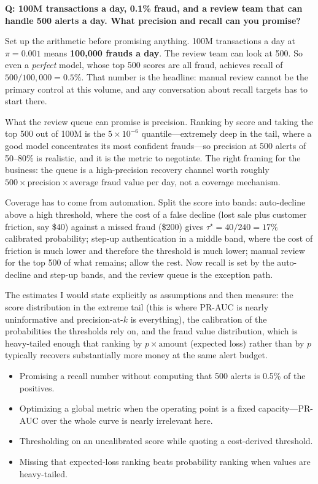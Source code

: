 \begin{interviewq}
\textbf{Q: 100M transactions a day, 0.1\% fraud, and a review team that can handle 500 alerts a day. What precision and recall can you promise?}

 \quad {} \quad \badgefreq{\freqmed}

\stronganswer

Set up the arithmetic before promising anything. 100M transactions a day at $\pi = 0.001$ means \textbf{100{,}000 frauds a day}. The review team can look at 500. So even a \emph{perfect} model, whose top 500 scores are all fraud, achieves recall of $500/100{,}000 = 0.5\%$. That number is the headline: manual review cannot be the primary control at this volume, and any conversation about recall targets has to start there.

What the review queue can promise is precision. Ranking by score and taking the top 500 out of 100M is the $5\times10^{-6}$ quantile---extremely deep in the tail, where a good model concentrates its most confident frauds---so precision at 500 alerts of 50--80\% is realistic, and it is the metric to negotiate. The right framing for the business: the queue is a high-precision recovery channel worth roughly $500 \times \text{precision} \times \text{average fraud value}$ per day, not a coverage mechanism.

Coverage has to come from automation. Split the score into bands: auto-decline above a high threshold, where the cost of a false decline (lost sale plus customer friction, say \$40) against a missed fraud (\$200) gives $\tau^\star = 40/240 = 17\%$ calibrated probability; step-up authentication in a middle band, where the cost of friction is much lower and therefore the threshold is much lower; manual review for the top 500 of what remains; allow the rest. Now recall is set by the auto-decline and step-up bands, and the review queue is the exception path.

The estimates I would state explicitly as assumptions and then measure: the score distribution in the extreme tail (this is where PR-AUC is nearly uninformative and precision-at-$k$ is everything), the calibration of the probabilities the thresholds rely on, and the fraud value distribution, which is heavy-tailed enough that ranking by $p \times \text{amount}$ (expected loss) rather than by $p$ typically recovers substantially more money at the same alert budget.

\redflags
\begin{itemize}
    \item Promising a recall number without computing that 500 alerts is 0.5\% of the positives.
    \item Optimizing a global metric when the operating point is a fixed capacity---PR-AUC over the whole curve is nearly irrelevant here.
    \item Thresholding on an uncalibrated score while quoting a cost-derived threshold.
    \item Missing that expected-loss ranking beats probability ranking when values are heavy-tailed.
\end{itemize}


\end{interviewq}
